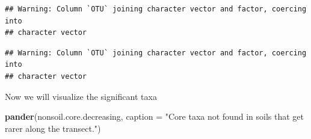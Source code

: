 \documentclass[]{article}
\newenvironment{Shaded}{\begin{snugshade}}{\end{snugshade}}
\newcommand{\KeywordTok}[1]{\textcolor[rgb]{0.13,0.29,0.53}{\textbf{#1}}}
\newcommand{\DataTypeTok}[1]{\textcolor[rgb]{0.13,0.29,0.53}{#1}}
\newcommand{\DecValTok}[1]{\textcolor[rgb]{0.00,0.00,0.81}{#1}}
\newcommand{\FloatTok}[1]{\textcolor[rgb]{0.00,0.00,0.81}{#1}}
\newcommand{\StringTok}[1]{\textcolor[rgb]{0.31,0.60,0.02}{#1}}
\newcommand{\CommentTok}[1]{\textcolor[rgb]{0.56,0.35,0.01}{\textit{#1}}}
\newcommand{\OperatorTok}[1]{\textcolor[rgb]{0.81,0.36,0.00}{\textbf{#1}}}
\newcommand{\NormalTok}[1]{#1}
\begin{document}
\begin{verbatim}
## Warning: Column `OTU` joining character vector and factor, coercing into
## character vector
\end{verbatim}

\begin{Shaded}
\end{Shaded}

\begin{verbatim}
## Warning: Column `OTU` joining character vector and factor, coercing into
## character vector
\end{verbatim}

Now we will visualize the significant taxa

\begin{Shaded}
\begin{Highlighting}[]
\KeywordTok{pander}\NormalTok{(nonsoil.core.decreasing, }\DataTypeTok{caption =} \StringTok{"Core taxa not found in soils that get rarer along the transect."}\NormalTok{)}
\end{Highlighting}
\end{Shaded}
\end{document}
